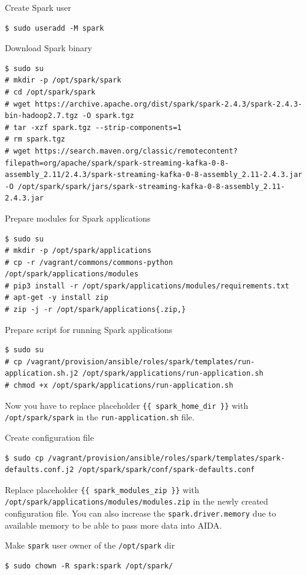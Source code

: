 \documentclass[a4paper]{article} %
\begin{document}
Create Spark user
\begin{lstlisting}
$ sudo useradd -M spark
\end{lstlisting}

Download Spark binary
\begin{lstlisting}
$ sudo su
# mkdir -p /opt/spark/spark
# cd /opt/spark/spark
# wget https://archive.apache.org/dist/spark/spark-2.4.3/spark-2.4.3-bin-hadoop2.7.tgz -O spark.tgz
# tar -xzf spark.tgz --strip-components=1
# rm spark.tgz
# wget https://search.maven.org/classic/remotecontent?filepath=org/apache/spark/spark-streaming-kafka-0-8-assembly_2.11/2.4.3/spark-streaming-kafka-0-8-assembly_2.11-2.4.3.jar -O /opt/spark/spark/jars/spark-streaming-kafka-0-8-assembly_2.11-2.4.3.jar
\end{lstlisting}

Prepare modules for Spark applications
\begin{lstlisting}
$ sudo su
# mkdir -p /opt/spark/applications
# cp -r /vagrant/commons/commons-python /opt/spark/applications/modules
# pip3 install -r /opt/spark/applications/modules/requirements.txt
# apt-get -y install zip
# zip -j -r /opt/spark/applications{.zip,}
\end{lstlisting}

Prepare script for running Spark applications
\begin{lstlisting}
$ sudo su
# cp /vagrant/provision/ansible/roles/spark/templates/run-application.sh.j2 /opt/spark/applications/run-application.sh
# chmod +x /opt/spark/applications/run-application.sh
\end{lstlisting}

Now you have to replace placeholder \texttt{\{\{ spark\_home\_dir \}\}} with \texttt{/opt/spark/spark}
in the \texttt{run-application.sh} file.

Create configuration file
\begin{lstlisting}
$ sudo cp /vagrant/provision/ansible/roles/spark/templates/spark-defaults.conf.j2 /opt/spark/spark/conf/spark-defaults.conf
\end{lstlisting}

Replace placeholder \texttt{\{\{ spark\_modules\_zip \}\}} with \texttt{/opt/spark/applications/modules/modules.zip}
in the newly created configuration file. You can also increase the \texttt{spark.driver.memory} due to available
memory to be able to pass more data into AIDA.

Make \texttt{spark} user owner of the \texttt{/opt/spark} dir
\begin{lstlisting}
$ sudo chown -R spark:spark /opt/spark/
\end{lstlisting}
\end{document}

